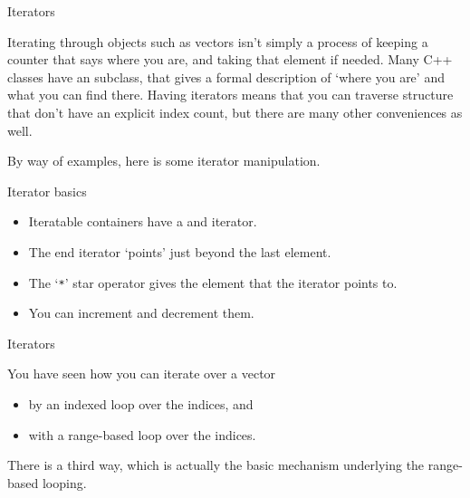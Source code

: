 
 {Iterators}
\label{sec:iterator-use}

Iterating through objects such as vectors isn't simply a process
of keeping a counter that says where you are, and taking that element if needed.
Many C++ classes have an  subclass,
that gives a formal description of `where you are' and what you can find there.
Having iterators means that you can traverse structure that don't have
an explicit index count, but there are many other conveniences as well.

By way of examples, here is some iterator manipulation.

\begin{block}{Iterator basics}
  \begin{itemize}
  \item
    Iteratable containers have a  and  iterator.
  \item
    The end iterator `points' just beyond the last element.
  \item The `\lstinline+*+' star operator gives the element that the iterator points to.
  \item You can increment and decrement them.
  \end{itemize}
\end{block}

 {Iterators}
\label{sec:iterator}

You have seen how you can iterate over a vector
\begin{itemize}
\item by an indexed loop over the indices, and
\item with a range-based loop over the indices.
\end{itemize}
There is a third way, which is actually the basic mechanism underlying
the range-based looping.

